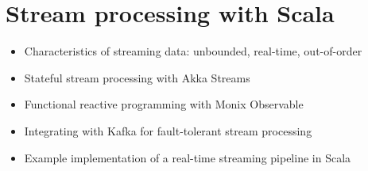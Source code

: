 \chapter{ Stream processing with Scala }

\begin{itemize}
    \item Characteristics of streaming data: unbounded, real-time, out-of-order
    \item Stateful stream processing with Akka Streams
    \item Functional reactive programming with Monix Observable
    \item Integrating with Kafka for fault-tolerant stream processing
    \item Example implementation of a real-time streaming pipeline in Scala
\end{itemize}
